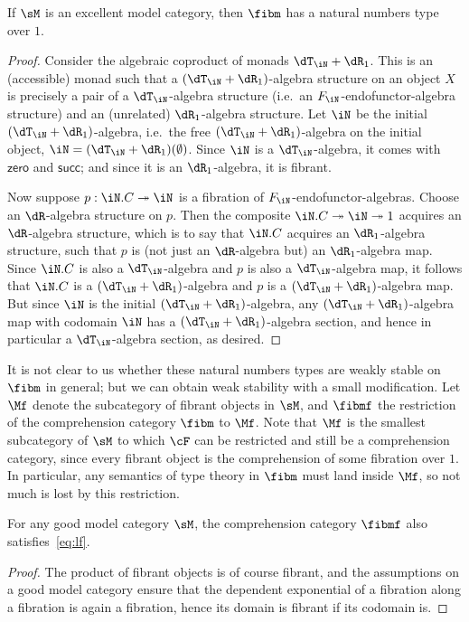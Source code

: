 \documentclass{amsart}
\let\N\iN
\def\zero{\mathsf{zero}}
\def\succ{\mathsf{succ}}
\begin{document}
\begin{thm}
  If $\sM$ is an excellent model category, then $\fibm$ has a natural numbers type over $1$.
\end{thm}
\begin{proof}
  Consider the algebraic coproduct of monads $\dT_\N+\dR_1$.
  This is an (accessible) monad such that a $(\dT_\N+\dR_1)$-algebra structure on an object $X$ is precisely a pair of a $\dT_\N$-algebra structure (i.e.\ an $F_\N$-endofunctor-algebra structure) and an (unrelated) $\dR_1$-algebra structure.
  Let $\N$ be the initial $(\dT_\N+\dR_1)$-algebra, i.e.\ the free $(\dT_\N+\dR_1)$-algebra on the initial object, $\N =(\dT_\N+\dR_1)(\emptyset)$.
  Since $\N$ is a $\dT_\N$-algebra, it comes with $\zero$ and $\succ$; and since it is an $\dR_1$-algebra, it is fibrant.

  Now suppose $p:\N.C\fib \N$ is a fibration of $F_\N$-endofunctor-algebras.
  Choose an $\dR$-algebra structure on $p$.
  Then the composite $\N.C\fib\N\fib 1$ acquires an $\dR$-algebra structure, which is to say that $\N.C$ acquires an $\dR_1$-algebra structure, such that $p$ is (not just an $\dR$-algebra but) an $\dR_1$-algebra map.
  Since $\N.C$ is also a $\dT_\N$-algebra and $p$ is also a $\dT_\N$-algebra map, it follows that $\N.C$ is a $(\dT_\N+\dR_1)$-algebra and $p$ is a $(\dT_\N+\dR_1)$-algebra map.
  But since $\N$ is the initial $(\dT_\N+\dR_1)$-algebra, any $(\dT_\N+\dR_1)$-algebra map with codomain $\N$ has a $(\dT_\N+\dR_1)$-algebra section, and hence in particular a $\dT_\N$-algebra section, as desired.
\end{proof}

It is not clear to us whether these natural numbers types are weakly stable on $\fibm$ in general; but we can obtain weak stability with a small modification.
Let $\Mf$ denote the subcategory of fibrant objects in $\sM$, and $\fibmf$ the restriction of the comprehension category $\fibm$ to $\Mf$.
Note that $\Mf$ is the smallest subcategory of $\sM$ to which $\cF$ can be restricted and still be a comprehension category, since every fibrant object is the comprehension of some fibration over $1$.
In particular, any semantics of type theory in $\fibm$ must land inside $\Mf$, so not much is lost by this restriction.

\begin{lem}
  For any good model category $\sM$, the comprehension category $\fibmf$ also satisfies~\eqref{eq:lf}.
\end{lem}
\begin{proof}
  The product of fibrant objects is of course fibrant, and the assumptions on a good model category ensure that the dependent exponential of a fibration along a fibration is again a fibration, hence its domain is fibrant if its codomain is.
\end{proof}
\end{document}
